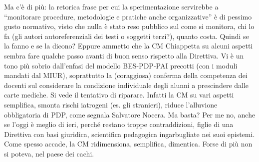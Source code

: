 Ma c'è di più: la retorica frase per cui la sperimentazione servirebbe a “monitorare procedure, metodologie e pratiche anche organizzative”  è di pessimo gusto normativo, visto che nulla è stato reso pubblico sul come si monitora, chi lo fa (gli autori autoreferenziali dei testi o soggetti terzi?), quanto costa. Quindi se la fanno e se la dicono?
Eppure ammetto che la CM Chiappetta su alcuni aspetti sembra fare qualche passo avanti di buon senso rispetto alla Direttiva.  Vi è  un tono più sobrio dall'enfasi del modello BES-PDP-PAI precotti (con i moduli mandati dal MIUR), soprattutto la (coraggiosa) conferma della competenza dei docenti sul considerare  la condizione individuale degli alunni a prescindere dalle carte mediche. Si vede il tentativo di riparare. Infatti la CM su vari aspetti semplifica,  smonta  rischi iatrogeni (es. gli stranieri), riduce l'alluvione obbligatoria di PDP, come segnala Salvatore Nocera. Ma basta?  Per me no, anche se l'oggi è meglio di ieri, perché restano troppe contraddizioni, figlie di una Direttiva con basi giuridica, scientifica pedagogica ingarbugliate nei suoi epistemi.  Come spesso accade, la CM ridimensiona, semplifica, dimentica. Forse di più non si poteva, nel paese dei cachi.
